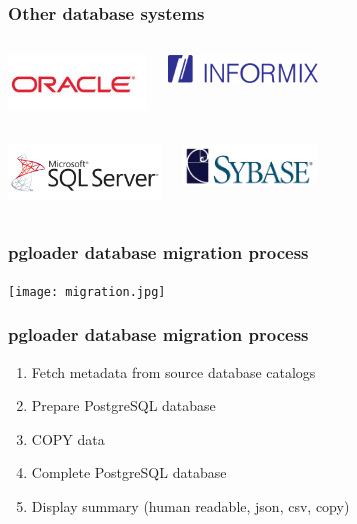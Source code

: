 \documentclass{beamer}
\begin{document}
\begin{frame}
  \frametitle{Other database systems}

  \begin{columns}[c]
    \begin{center}
      \includegraphics[height=4em]{oracle-logo.png}
    \end{center}
    \begin{center}
      \includegraphics[height=2em]{Informix_d1323_450x450.png}
    \end{center}
  \end{columns}
  \vfill

  \begin{columns}[c]
    \begin{center}
      \includegraphics[height=4em]{mssql.png}
    \end{center}
    \begin{center}
      \includegraphics[height=3em]{sybase_logo.png}
    \end{center}
  \end{columns}
\end{frame}

\begin{frame}
  \frametitle{pgloader database migration process}

  \begin{center}
    \texttt{[image: migration.jpg]}
  \end{center}
\end{frame}

\begin{frame}[fragile]
  \frametitle{pgloader database migration process}

  \vfill
  
  \begin{enumerate}
  \item Fetch metadata from source database catalogs
  \item Prepare PostgreSQL database
  \item COPY data
  \item Complete PostgreSQL database
  \item Display summary (human readable, json, csv, copy)
  \end{enumerate}
\end{frame}
\end{document}
